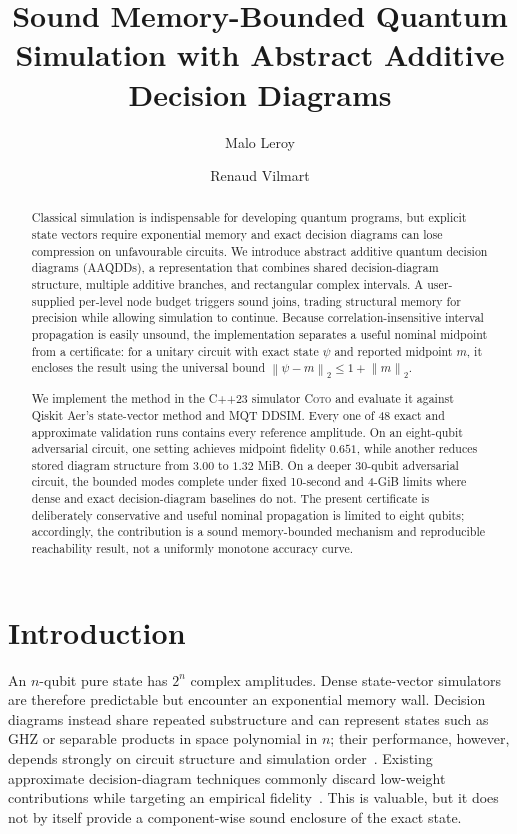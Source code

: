 \documentclass[sigconf,nonacm]{acmart}
\title{Sound Memory-Bounded Quantum Simulation with Abstract Additive Decision Diagrams}
\author{Malo Leroy}
\author{Renaud Vilmart}
\newcommand{\tool}{\textsc{Coto}}
\newcommand{\aaqdd}{AAQDD}
\newcommand{\norm}[1]{\left\lVert #1\right\rVert}
\begin{document}
\begin{abstract}
Classical simulation is indispensable for developing quantum programs, but explicit state
vectors require exponential memory and exact decision diagrams can lose compression on
unfavourable circuits. We introduce abstract additive quantum decision diagrams
(\aaqdd{}s), a representation that combines shared decision-diagram structure, multiple
additive branches, and rectangular complex intervals. A user-supplied per-level node budget
triggers sound joins, trading structural memory for precision while allowing simulation to
continue. Because correlation-insensitive interval propagation is easily unsound, the
implementation separates a useful nominal midpoint from a certificate: for a unitary circuit
with exact state $\psi$ and reported midpoint $m$, it encloses the result using the universal
bound $\norm{\psi-m}_2 \leq 1+\norm{m}_2$.

We implement the method in the C++23 simulator \tool{} and evaluate it against Qiskit Aer's
state-vector method and MQT DDSIM. Every one of 48 exact and approximate validation runs
contains every reference amplitude. On an eight-qubit adversarial circuit, one setting
achieves midpoint fidelity $0.651$, while another reduces stored diagram structure from
$3.00$ to $1.32$ MiB. On a deeper 30-qubit adversarial circuit, the bounded modes complete
under fixed 10-second and 4-GiB limits where dense and exact decision-diagram baselines do
not. The present certificate is deliberately conservative and useful nominal propagation is
limited to eight qubits; accordingly, the contribution is a sound memory-bounded mechanism
and reproducible reachability result, not a uniformly monotone accuracy curve.
\end{abstract}


\maketitle

\section{Introduction}

An $n$-qubit pure state has $2^n$ complex amplitudes. Dense state-vector simulators are
therefore predictable but encounter an exponential memory wall. Decision diagrams instead
share repeated substructure and can represent states such as GHZ or separable products in
space polynomial in $n$; their performance, however, depends strongly on circuit structure
and simulation order~\cite{wille2022tools,burgholzer2022paths}. Existing approximate
decision-diagram techniques commonly discard low-weight contributions while targeting an
empirical fidelity~\cite{zulehner2020approximation}. This is valuable, but it does not by
itself provide a component-wise sound enclosure of the exact state.
\end{document}

